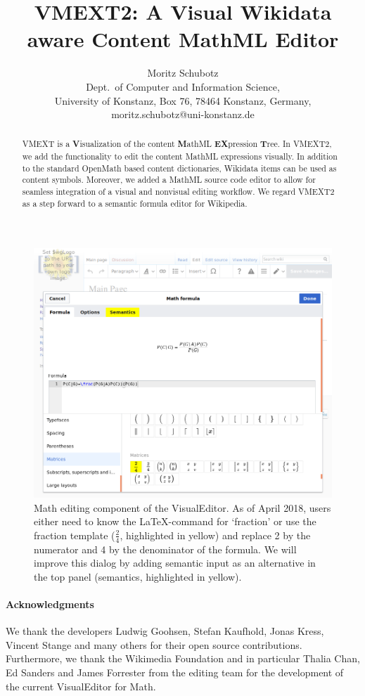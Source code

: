 \documentclass[a4paper]{article}
\title{VMEXT2: A Visual Wikidata aware Content MathML Editor}
\author{Moritz Schubotz \\
 Dept.~of Computer and Information Science,\\
 University of Konstanz, Box 76, 78464 Konstanz, Germany,\\
 moritz.schubotz@uni-konstanz.de
}
\begin{document}
\maketitle

\begin{abstract}
VMEXT is a {\bf V}isualization of the content {\bf M}athML {\bf EX}pression {\bf T}ree.
In VMEXT2, we add the functionality to edit the content MathML expressions visually.
In addition to the standard OpenMath based content dictionaries, Wikidata items can be used as content symbols.
Moreover, we added a MathML source code editor to allow for seamless integration of a visual and nonvisual editing workflow.
We regard VMEXT2 as a step forward to a semantic formula editor for Wikipedia.
\end{abstract}

\begin{figure}[t]
\includegraphics[width=\textwidth]{images/overview.png}
\caption{Math editing component of the VisualEditor.
 As of April 2018, users either need to know the LaTeX-command for `fraction' or use the fraction template ($\frac{2}{4}$, highlighted in yellow) and replace 2 by the numerator and 4 by the denominator of the formula.
 We will improve this dialog by adding semantic input as an alternative in the top panel (semantics, highlighted in yellow).}\label{fig.overview}
\end{figure}
\paragraph*{Acknowledgments} We thank the developers Ludwig Goohsen, Stefan Kaufhold, Jonas Kress, Vincent Stange and many others for their open source contributions.
 Furthermore, we thank the Wikimedia Foundation and in particular Thalia Chan, Ed Sanders and James Forrester from the editing team for the development of the current VisualEditor for Math.
\printbibliography[keyword=primary]
\end{document}
